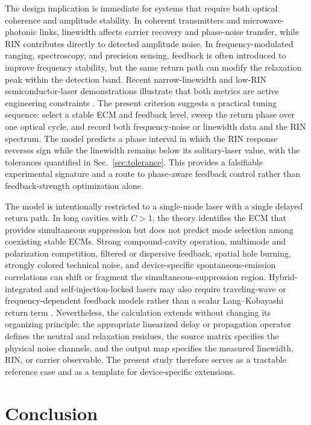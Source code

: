 \documentclass{optica-article}
\newif\ifmarked
\newcommand{\rev}[1]{\ifmarked{\color{blue}#1}\else#1\fi}
\begin{document}
The design implication is immediate for systems that require both optical coherence and amplitude stability. In coherent transmitters and microwave-photonic links, linewidth affects carrier recovery and phase-noise transfer, while RIN contributes directly to detected amplitude noise. In frequency-modulated ranging, spectroscopy, and precision sensing, feedback is often introduced to improve frequency stability, but the same return path can modify the relaxation peak within the detection band. Recent narrow-linewidth and low-RIN semiconductor-laser demonstrations illustrate that both metrics are active engineering constraints \cite{WangReview2024,Song2025,Surrow2025}. The present criterion suggests a practical tuning sequence: select a stable ECM and feedback level, sweep the return phase over one optical cycle, and record both frequency-noise or linewidth data and the RIN spectrum. The model predicts a phase interval in which the RIN response reverses sign while the linewidth remains below its solitary-laser value\rev{, with the tolerances quantified in Sec.~\ref{sec:tolerance}}. This provides a falsifiable experimental signature and a route to phase-aware feedback control rather than feedback-strength optimization alone.

The model is intentionally restricted to a single-mode laser with a single delayed return path. \rev{In long cavities with $C>1$, the theory identifies the ECM that provides simultaneous suppression but does not predict mode selection among coexisting stable ECMs.} Strong compound-cavity operation, multimode and polarization competition, filtered or dispersive feedback, spatial hole burning, strongly colored technical noise, and device-specific spontaneous-emission correlations can shift or fragment the simultaneous-suppression region. Hybrid-integrated and self-injection-locked lasers may also require traveling-wave or frequency-dependent feedback models rather than a scalar Lang--Kobayashi return term \cite{Li2023,Prokoshin2024}. Nevertheless, the calculation extends without changing its organizing principle: the appropriate linearized delay or propagation operator defines the neutral and relaxation residues, the source matrix specifies the physical noise channels, and the output map specifies the measured linewidth, RIN, or carrier observable. The present study therefore serves as a tractable reference case and as a template for device-specific extensions.

\section{Conclusion}
\end{document}
